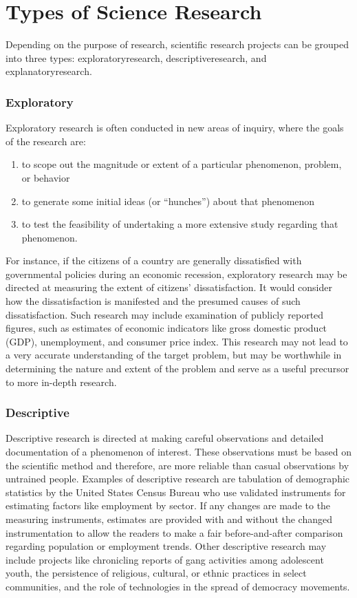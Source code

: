 \section{Types of Science Research}

Depending on the purpose of research, scientific research projects can be grouped into three types: \gls{exploratoryresearch}, \gls{descriptiveresearch}, and \gls{explanatoryresearch}. 

\subsubsection{Exploratory}

Exploratory research is often conducted in new areas of inquiry, where the goals of the research are: 

\begin{enumerate}
	\item to scope out the magnitude or extent of a particular phenomenon, problem, or behavior
	\item to generate some initial ideas (or ``hunches'') about that phenomenon
	\item to test the feasibility of undertaking a more extensive study regarding that phenomenon. 
\end{enumerate}

For instance, if the citizens of a country are generally dissatisfied with governmental policies during an economic recession, exploratory research may be directed at measuring the extent of citizens' dissatisfaction. It would consider how the dissatisfaction is manifested and the presumed causes of such dissatisfaction. Such research may include examination of publicly reported figures, such as estimates of economic indicators like gross domestic product (GDP), unemployment, and consumer price index. This research may not lead to a very accurate understanding of the target problem, but may be worthwhile in determining the nature and extent of the problem and serve as a useful precursor to more in-depth research.

\subsubsection{Descriptive}

Descriptive research is directed at making careful observations and detailed documentation of a phenomenon of interest. These observations must be based on the scientific method and therefore, are more reliable than casual observations by untrained people. Examples of descriptive research are tabulation of demographic statistics by the United States Census Bureau who use validated instruments for estimating factors like employment by sector. If any changes are made to the measuring instruments, estimates are provided with and without the changed instrumentation to allow the readers to make a fair before-and-after comparison regarding population or employment trends. Other descriptive research may include projects like chronicling reports of gang activities among adolescent youth, the persistence of religious, cultural, or ethnic practices in select communities, and the role of technologies in the spread of democracy movements.

